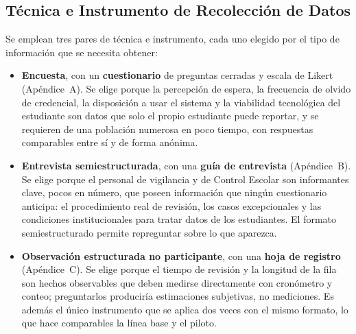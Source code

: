 \subsection{Técnica e Instrumento de Recolección de Datos}
Se emplean tres pares de técnica e instrumento, cada uno elegido por el tipo
de información que se necesita obtener:
\begin{itemize}
	\item \textbf{Encuesta}, con un \textbf{cuestionario} de preguntas cerradas
	      y escala de Likert (Apéndice~A). Se elige porque la percepción de espera, la
	      frecuencia de olvido de credencial, la disposición a usar el sistema y la
	      viabilidad tecnológica del estudiante son datos que solo el propio
	      estudiante puede reportar, y se requieren de una población numerosa en poco
	      tiempo, con respuestas comparables entre sí y de forma anónima.
	\item \textbf{Entrevista semiestructurada}, con una \textbf{guía de
		      entrevista} (Apéndice~B). Se elige porque el personal de vigilancia y de
	      Control Escolar son informantes clave, pocos en número, que poseen
	      información que ningún cuestionario anticipa: el procedimiento real de
	      revisión, los casos excepcionales y las condiciones institucionales para
	      tratar datos de los estudiantes. El formato semiestructurado permite
	      repreguntar sobre lo que aparezca.
	\item \textbf{Observación estructurada no participante}, con una \textbf{hoja
		      de registro} (Apéndice~C). Se elige porque el tiempo de revisión y la
	      longitud de la fila son hechos observables que deben medirse
	      directamente con cronómetro y conteo; preguntarlos produciría estimaciones
	      subjetivas, no mediciones. Es además el único instrumento que se aplica dos
	      veces con el mismo formato, lo que hace comparables la línea base y el
	      piloto.
\end{itemize}

